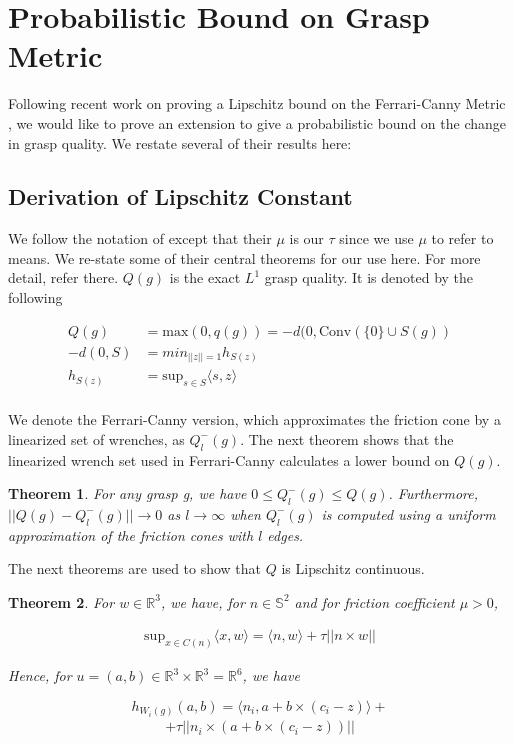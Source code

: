 \documentclass[letterpaper, 10 pt, conference]{ieeeconf}  %
\newtheorem{theorem}{Theorem}
\begin{document}
\section{Probabilistic Bound on Grasp Metric}
\label{sec:bound}
Following recent work on proving a Lipschitz bound on the Ferrari-Canny Metric \cite{pokorny2013classical}, we would like to prove an extension to give a probabilistic bound on the change in grasp quality.
We restate several of their results here:

\subsection{Derivation of Lipschitz Constant }

We follow the notation of \cite{pokorny2013classical} except that their $\mu$ is our $\tau$ since we use $\mu$ to refer to means.  
We re-state some of their central theorems for our use here.
For more detail, refer there.
$Q(g)$ is the exact $L^1$ grasp quality.
It is denoted by the following 

\begin{align}
  Q(g) &= \mbox{max}(0,q(g)) = -d(0,\mbox{Conv}(\{0\} \cup S(g))\\
-d(0,S) &= min_{||z|| = 1} h_{S(z)}\\
h_{S(z)} &= \mbox{sup}_{s\in S}\langle s,z\rangle\\
\end{align}

We denote the Ferrari-Canny version, which approximates the friction cone by a linearized set of wrenches\cite{ferrari1992}, as $Q^-_l(g)$.
The next theorem shows that the linearized wrench set used in Ferrari-Canny calculates a lower bound on $Q(g)$.\\

\begin{theorem}
  \cite{pokorny2013classical}
For any grasp g, we have $0 \leq Q_l^-(g) \leq Q(g)$.
Furthermore, $||Q(g) - Q^-_l(g)|| \rightarrow 0$ as $l \rightarrow \infty$ when $Q_l^-(g)$ is computed using a uniform approximation of the friction cones with $l$ edges. \\
\end{theorem}

The next theorems are used to show that $Q$ is Lipschitz continuous.

\begin{theorem}
\label{lemma35}
  \cite{pokorny2013classical}
For $w \in \mathbb{R}^3$, we have, for $n \in \mathbb{S}^2$ and for friction coefficient $\mu > 0$, 

\begin{align}
\mbox{sup}_{x \in C(n)} \langle x,w \rangle = \langle n,w \rangle + \tau||n \times w||
\end{align}

Hence, for $u = (a,b) \in \mathbb{R}^3 \times \mathbb{R}^3 = \mathbb{R}^6$, we have 

\[
h_{W_i(g)}(a,b) =
 \langle n_i,a+b\times(c_i-z)\rangle +
\]
\begin{align}
 +\tau ||n_i \times (a+b\times(c_i-z))||
\end{align}

\end{theorem}
\end{document}
